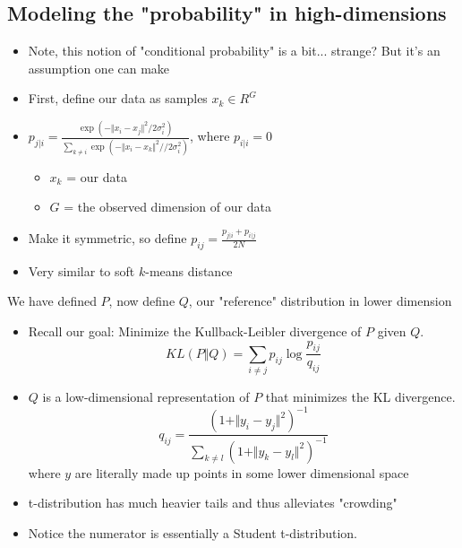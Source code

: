 \documentclass[10pt]{article}
\begin{document}
\subsection*{Modeling the "probability" in high-dimensions}
\begin{itemize}
    \item Note, this notion of "conditional probability" is a bit... strange?  But it's an assumption one can make
    \item First, define our data as samples $x_k \in R^G$
    \item $p_{j \vert i} = \frac{\exp (- \Vert x_i - x_j \Vert^2 / 2 \sigma_i^2)}{\sum_{k \neq i} \exp (- \Vert x_i - x_k \Vert^2 // 2\sigma_i^2)}$, where $p_{i \vert i} = 0$
    \begin{itemize}
        \item $x_k$ = our data
        \item $G$ = the observed dimension of our data
    \end{itemize}
    \item Make it symmetric, so define $p_{ij} = \frac{p_{j \vert i} + p_{i \vert j}}{2N}$
    \item Very similar to soft $k$-means distance
\end{itemize}
We have defined $P$, now define $Q$, our "reference" distribution in lower dimension
\begin{itemize}
    \item Recall our goal: Minimize the Kullback-Leibler divergence of $P$ given $Q$.
    \[KL(P \Vert Q) = \sum_{i \neq j} p_{ij} \log \frac{p_{ij}}{q_{ij}}\]
    \item $Q$ is a low-dimensional representation of $P$ that minimizes the KL divergence.
    \[q_{ij} = \frac{(1 + \Vert y_i - y_j \Vert^2)^{-1}}{\sum_{k \neq l} (1 + \Vert y_k - y_l \Vert^2)^{-1}}\]
    where $y$ are literally made up points in some lower dimensional space
    \item t-distribution has much heavier tails and thus alleviates "crowding"
    \item Notice the numerator is essentially a Student t-distribution.
\end{itemize}
\end{document}
